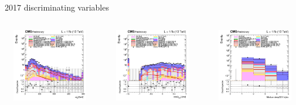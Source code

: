 \documentclass[8pt]{beamer}
\begin{document}
\begin{frame}{2017 discriminating variables}
\begin{columns}
\begin{column}{0.33\textwidth}
\begin{center}
    		\end{center}		
		\end{column}
\end{columns}
\begin{columns}
		\begin{column}{0.33\textwidth}
			\begin{center}
     			\includegraphics[width=1.0\textwidth, height=90pt]{figs/2017/log_cratio_topCR_ll_mblt.png}
    		\end{center}		
		\end{column}
		\begin{column}{0.33\textwidth}
			\begin{center}
     			\includegraphics[width=1.0\textwidth, height=90pt]{figs/2017/log_cratio_topCR_ll_costhetall.png}
    		\end{center}		
		\end{column}
		\begin{column}{0.33\textwidth}
			\begin{center}
     			\includegraphics[width=1.0\textwidth, height=90pt]{figs/2017/log_cratio_topCR_ll_nbjet.png}
    		\end{center}		
		\end{column}
\end{columns} \vfill
\end{frame}
\end{document}
